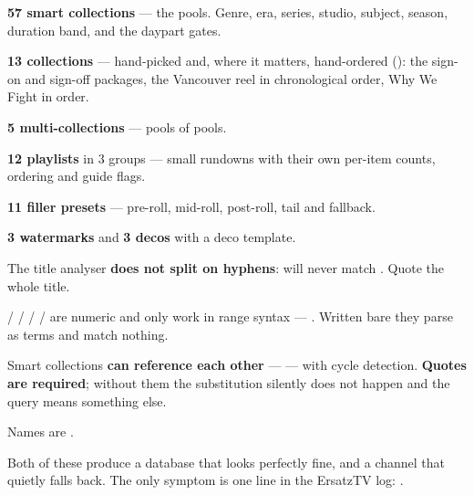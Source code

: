 \documentclass[fontpath=fonts/,logopath=logo/]{riposte-doc}
\begin{document}
\begin{ripbullets}
\item \textbf{57 smart collections} — the pools. Genre, era, series, studio, subject, season, duration band, and the daypart gates.
\item \textbf{13 collections} — hand-picked and, where it matters, hand-ordered (): the sign-on and sign-off packages, the Vancouver reel in chronological order, Why We Fight in order.
\item \textbf{5 multi-collections} — pools of pools.
\item \textbf{12 playlists} in 3 groups — small rundowns with their own per-item counts, ordering and guide flags.
\item \textbf{11 filler presets} — pre-roll, mid-roll, post-roll, tail and fallback.
\item \textbf{3 watermarks} and \textbf{3 decos} with a deco template.
\end{ripbullets}



\begin{ripbullets}
\item The title analyser \textbf{does not split on hyphens}:  will never match . Quote the whole title.
\item {} /  /  /  /  are numeric and only work in range syntax — . Written bare they parse as terms and match nothing.
\item Smart collections \textbf{can reference each other} —  — with cycle detection. \textbf{Quotes are required}; without them the substitution silently does not happen and the query means something else.
\item Names are .
\end{ripbullets}



Both of these produce a database that looks perfectly fine, and a channel that quietly falls back. The only symptom is one line in the ErsatzTV log: .
\end{document}
